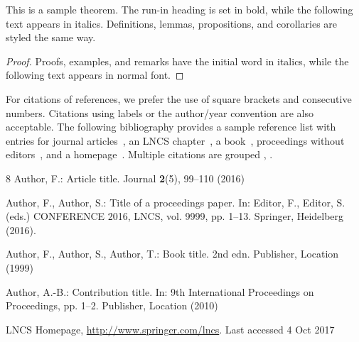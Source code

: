 \documentclass[runningheads]{llncs}
\begin{document}
\begin{theorem}
This is a sample theorem. The run-in heading is set in bold, while
the following text appears in italics. Definitions, lemmas,
propositions, and corollaries are styled the same way.
\end{theorem}
%
%
\begin{proof}
Proofs, examples, and remarks have the initial word in italics,
while the following text appears in normal font.
\end{proof}
For citations of references, we prefer the use of square brackets
and consecutive numbers. Citations using labels or the author/year
convention are also acceptable. The following bibliography provides
a sample reference list with entries for journal
articles~\cite{ref_article1}, an LNCS chapter~\cite{ref_lncs1}, a
book~\cite{ref_book1}, proceedings without editors~\cite{ref_proc1},
and a homepage~\cite{ref_url1}. Multiple citations are grouped
\cite{ref_article1,ref_lncs1,ref_book1},
\cite{ref_article1,ref_book1,ref_proc1,ref_url1}.
%
%
%
% 
% 
%
\begin{thebibliography}{8}
Author, F.: Article title. Journal \textbf{2}(5), 99--110 (2016)

Author, F., Author, S.: Title of a proceedings paper. In: Editor,
F., Editor, S. (eds.) CONFERENCE 2016, LNCS, vol. 9999, pp. 1--13.
Springer, Heidelberg (2016). 

Author, F., Author, S., Author, T.: Book title. 2nd edn. Publisher,
Location (1999)

Author, A.-B.: Contribution title. In: 9th International Proceedings
on Proceedings, pp. 1--2. Publisher, Location (2010)

LNCS Homepage, \url{http://www.springer.com/lncs}. Last accessed 4
Oct 2017
\end{thebibliography}
\end{document}
